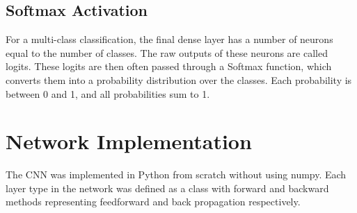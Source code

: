 \documentclass[conference]{IEEEtran}
\begin{document}
\subsection{Softmax Activation}
For a multi-class classification, the final dense layer has a number of neurons equal to the number of classes. The raw outputs of these neurons are called logits. These logits are then often passed through a Softmax function, which converts them into a probability distribution over the classes. Each probability is between 0 and 1, and all probabilities sum to 1.

\newpage

\section{Network Implementation}
The CNN was implemented in Python from scratch without using numpy. Each layer type in the network was defined as a class with forward and backward methods representing feedforward and back propagation respectively.
\end{document}

